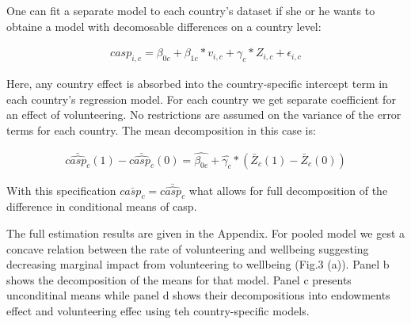 \documentclass[10pt, letterpaper]{article}
\begin{document}
\begin{spacing}{1.4}
One can fit a separate model to each country’s dataset if she or he wants to obtaine a model with decomosable differences on a country level: 

 \begin{eqnarray}
	casp_{i,c}= \beta_{0c}+ \beta_{1c}*v_{i,c} + \gamma_{c}*Z_{i,c} + \epsilon_{i,c}
 \end{eqnarray}


Here, any country effect is absorbed into the country-specific intercept term in each country’s regression model. For each country we get separate coefficient for an effect of volunteering.  No restrictions are assumed on the variance of the error terms for each country. The mean decomposition in this case is:

 \begin{eqnarray}
	\bar{\hat{casp_{c}}}(1)-\bar{\hat{casp_{c}}}(0)= \hat{\beta_{0c}}+\hat{\gamma_{c}}*(\bar{Z}_{c}(1)-\bar{Z}_{c}(0))
 \end{eqnarray}

With this specification $\bar{casp_{c}} = \bar{\hat{casp_c}}$ what allows for full decomposition of the difference in conditional means of casp. 


The full estimation results are given in the Appendix. For pooled model we gest a concave relation between the rate of volunteering and wellbeing suggesting decreasing marginal impact from volunteering to wellbeing (Fig.3 (a)). Panel b shows the decomposition of the means for that model. Panel c presents unconditinal means while panel d shows their decompositions into endowments effect and volunteering effec using teh country-specific models. 


\end{spacing}
\end{document}
